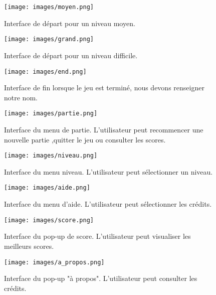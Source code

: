 \documentclass[a4paper, 11pt, oneside]{article}
\begin{document}
\begin{figure}[!h]
    \centering
    \texttt{[image: images/moyen.png]}
    \caption{Interface de départ pour un niveau moyen.}
    \label{fig:moyen}
\end{figure}

\begin{figure}
    \centering
    \texttt{[image: images/grand.png]}
    \caption{Interface de départ pour un niveau difficile.}
    \label{fig:difficile}
\end{figure}

\begin{figure}
    \centering
    \texttt{[image: images/end.png]}
    \caption{Interface de fin lorsque le jeu est terminé, nous devons renseigner notre nom.}
    \label{fig:end}
\end{figure}

\begin{figure}
    \centering
    \texttt{[image: images/partie.png]}
    \caption{Interface du menu de partie. L'utilisateur peut recommencer une nouvelle partie ,quitter le jeu ou consulter les scores.}
    \label{fig:partie}
\end{figure}

\begin{figure}
    \centering
    \texttt{[image: images/niveau.png]}
    \caption{Interface du menu niveau. L'utilisateur peut sélectionner un niveau.}
    \label{fig:niveau}
\end{figure}

\begin{figure}
    \centering
    \texttt{[image: images/aide.png]}
    \caption{Interface du menu d'aide. L'utilisateur peut sélectionner les crédits.}
    \label{fig:aide}
\end{figure}

\begin{figure}
    \centering
    \texttt{[image: images/score.png]}
    \caption{Interface du pop-up de score. L'utilisateur peut visualiser les meilleurs scores.}
    \label{fig:score}
\end{figure}

\begin{figure}
    \centering
    \texttt{[image: images/a\_propos.png]}
    \caption{Interface du pop-up "à propos". L'utilisateur peut consulter les crédits.}
    \label{fig:a_propos}
\end{figure}
\end{document}
